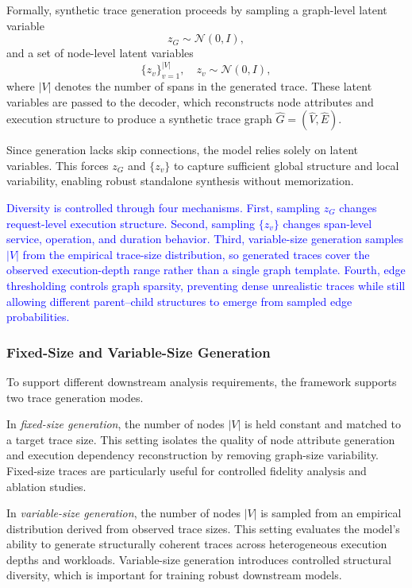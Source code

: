 \documentclass[sigconf,review]{acmart}
\begin{document}
Formally, synthetic trace generation proceeds by sampling a graph-level latent variable
\[
z_G \sim \mathcal{N}(0, I),
\]
and a set of node-level latent variables
\[
\{z_v\}_{v=1}^{|V|}, \quad z_v \sim \mathcal{N}(0, I),
\]
where $|V|$ denotes the number of spans in the generated trace. These latent variables are passed to the decoder, which reconstructs node attributes and execution structure to produce a synthetic trace graph $\hat{G} = (\hat{V}, \hat{E})$.

Since generation lacks skip connections, the model relies solely on latent variables. This forces $z_G$ and $\{z_v\}$ to capture sufficient global structure and local variability, enabling robust standalone synthesis without memorization.

\textcolor{blue}{Diversity is controlled through four mechanisms. First, sampling $z_G$ changes request-level execution structure. Second, sampling $\{z_v\}$ changes span-level service, operation, and duration behavior. Third, variable-size generation samples $|V|$ from the empirical trace-size distribution, so generated traces cover the observed execution-depth range rather than a single graph template. Fourth, edge thresholding controls graph sparsity, preventing dense unrealistic traces while still allowing different parent--child structures to emerge from sampled edge probabilities.}

\subsubsection{Fixed-Size and Variable-Size Generation}

To support different downstream analysis requirements, the framework supports two trace generation modes.

In \emph{fixed-size generation}, the number of nodes $|V|$ is held constant and matched to a target trace size. This setting isolates the quality of node attribute generation and execution dependency reconstruction by removing graph-size variability. Fixed-size traces are particularly useful for controlled fidelity analysis and ablation studies.

In \emph{variable-size generation}, the number of nodes $|V|$ is sampled from an empirical distribution derived from observed trace sizes. This setting evaluates the model’s ability to generate structurally coherent traces across heterogeneous execution depths and workloads. Variable-size generation introduces controlled structural diversity, which is important for training robust downstream models.
\end{document}
